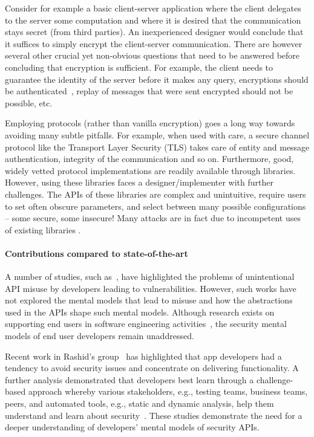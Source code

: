 \documentclass[10pt]{article}
\begin{document}
Consider for example a basic client-server application where the client delegates to the server some computation and where it is desired that the communication stays secret (from third parties).
An inexperienced designer would conclude that it suffices to simply encrypt the client-server communication. 
There are however several other crucial yet non-obvious questions that need to be answered before concluding that  encryption is sufficient. 
For example, the client needs to guarantee the identity of the server before it makes any query, encryptions should be authenticated~\cite{BN08}, replay of messages that were sent encrypted should not be possible, etc. 

Employing protocols (rather than vanilla encryption) goes a long way towards avoiding many subtle pitfalls.  
For example, when used with care, a secure channel protocol like the Transport Layer Security (TLS) takes care of entity and message authentication, integrity of the communication and so on.  Furthermore, good, widely vetted protocol implementations are readily available through libraries.  However, using these libraries faces a designer/implementer with further challenges.   The APIs of these libraries are complex and unintuitive, require users to set often obscure parameters, and select between many possible configurations -- some secure, some insecure!  Many attacks are in fact due to incompetent uses of existing libraries  \cite{GIJABS12}. 

\paragraph{Contributions compared to state-of-the-art} 
A number of studies, such as~\cite{enck2011, fahl2012, fischer2017}, have highlighted the problems of unintentional API misuse by developers leading to vulnerabilities. However, such works have not explored the mental models that lead to misuse and how the abstractions used in the APIs shape such mental models. Although research exists on supporting end users in software engineering activities~\cite{ko2011}, the security mental models of end user developers remain unaddressed. 

Recent work in Rashid's group~\cite{weir2016} has highlighted that app developers had a tendency to avoid security issues and concentrate on delivering functionality. A further analysis demonstrated that developers best learn through a challenge-based approach whereby various stakeholders, e.g., testing teams, business teams, peers, and automated tools, e.g., static and dynamic analysis, help them understand and learn about security~\cite{weir2017}. These studies demonstrate the need for a deeper understanding of developers' mental models of security APIs. 
\end{document}
